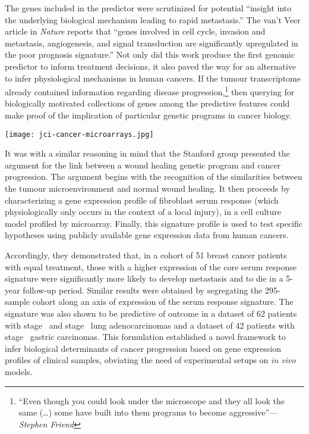 The genes included in the predictor were scrutinized for potential ``insight
into the underlying biological mechanism leading to rapid metastasis.''  The
van't Veer article in \emph{Nature} reports that ``genes involved in cell cycle,
invasion and metastasis, angiogenesis, and signal transduction are significantly
upregulated in the poor prognosis signature.''  Not only did this work produce
the first genomic predictor to inform treatment decisions, it also paved the way
for an alternative to infer physiological mechanisms in human cancers.  If the
tumour transcriptome already contained information regarding disease
progression,\footnote{``Even though you could look under the microscope and they
  all look the same (\ldots{}) some have built into them programs to become
  aggressive''---\emph{Stephen Friend}} then querying for biologically motivated
collections of genes among the predictive features could make proof of the
implication of particular genetic programs in cancer biology.


\begin{marginfigure}%
  \texttt{[image: jci-cancer-microarrays.jpg]}
  \caption[Cover of \emph{The Journal of Clinical Investigation} of June
  1\textsuperscript{st}, 2005]{Cover of \emph{The Journal of Clinical
      Investigation} of June 1\textsuperscript{st}, 2005.}
  \label{fig:cancer-microarray}
\end{marginfigure}

It was with a similar reasoning in mind that the Stanford group presented the
argument for the link between a wound healing genetic program and cancer
progression.\cite{chang_gene_2004} The argument begins with the recognition of
the similarities between the tumour microenvironment and normal wound healing.
It then proceeds by characterizing a gene expression profile of fibroblast serum
response (which physiologically only occurs in the context of a local injury),
in a cell culture model profiled by microarray.  Finally, this signature profile
is used to test specific hypotheses using publicly available gene expression
data from human cancers.

Accordingly, they demonstrated that, in a cohort of 51
breast cancer patients with equal treatment, those with a higher expression of
the core serum response signature were significantly more likely to develop
metastasis and to die in a \mbox{5-year} \mbox{follow-up} period.  Similar
results were obtained by segregating the \mbox{295-sample} 
cohort along an axis of expression of the serum response signature.  The
signature was also shown to be predictive of outcome in a dataset of 62 patients
with \mbox{stage } and \mbox{stage } lung
adenocarcinomas\cite{garber_diversity_2001} and a dataset of 42 patients with
\mbox{stage } gastric carcinomas.\cite{leung_phospholipase_2002}
This formulation established a novel framework to infer biological determinants
of cancer progression based on gene expression profiles of clinical samples,
obviating the need of experimental setups on \emph{in vivo} models.

